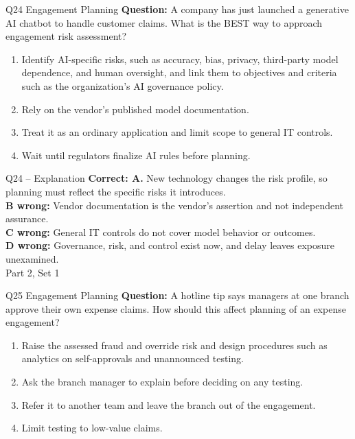 \documentclass[aspectratio=169,10pt]{beamer}
\begin{document}
\begin{frame}[t]{Q24 \hfill {\scriptsize Engagement Planning}}
	\small
	\textbf{Question:} A company has just launched a generative AI chatbot to handle customer claims. What is the BEST way to approach engagement risk assessment?
	\begin{enumerate}[label=\Alph*.,itemsep=1pt,topsep=3pt]
			\item Identify AI-specific risks, such as accuracy, bias, privacy, third-party model dependence, and human oversight, and link them to objectives and criteria such as the organization's AI governance policy.
			\item Rely on the vendor's published model documentation.
			\item Treat it as an ordinary application and limit scope to general IT controls.
			\item Wait until regulators finalize AI rules before planning.
	\end{enumerate}
\end{frame}
\begin{frame}[t]{Q24 -- Explanation}
	\footnotesize
	\textbf{Correct: A.} New technology changes the risk profile, so planning must reflect the specific risks it introduces. \\[5pt]
\textbf{B wrong:} Vendor documentation is the vendor's assertion and not independent assurance. \\[3pt]
\textbf{C wrong:} General IT controls do not cover model behavior or outcomes. \\[3pt]
\textbf{D wrong:} Governance, risk, and control exist now, and delay leaves exposure unexamined. \\[3pt]
	\vfill {\tiny Part 2, Set 1}
\end{frame}
\begin{frame}[t]{Q25 \hfill {\scriptsize Engagement Planning}}
	\small
	\textbf{Question:} A hotline tip says managers at one branch approve their own expense claims. How should this affect planning of an expense engagement?
	\begin{enumerate}[label=\Alph*.,itemsep=1pt,topsep=3pt]
			\item Raise the assessed fraud and override risk and design procedures such as analytics on self-approvals and unannounced testing.
			\item Ask the branch manager to explain before deciding on any testing.
			\item Refer it to another team and leave the branch out of the engagement.
			\item Limit testing to low-value claims.
	\end{enumerate}
\end{frame}
\end{document}
